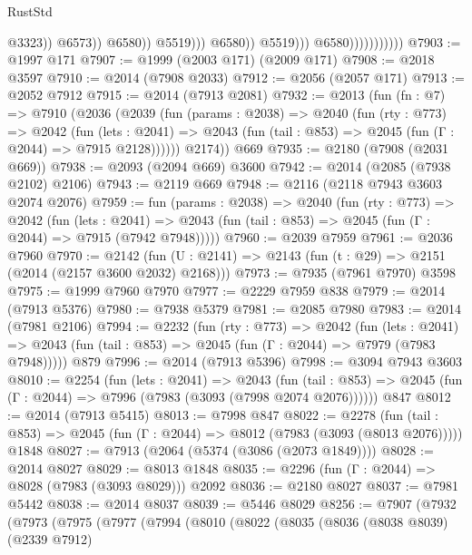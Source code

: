 \begin{lexlean}{RustStd}
\begin{coremodule}
                                                      @3323))
                                                  @6573))
                                              @6580))
                                          @5519)))
                                    @6580))
                                @5519)))
                          @6580)))))))))))
@7903 := @1997 @171
@7907 := @1999 (@2003 @171) (@2009 @171)
@7908 := @2018 @3597
@7910 := @2014 (@7908 @2033)
@7912 := @2056 (@2057 @171)
@7913 := @2052 @7912
@7915 := @2014 (@7913 @2081)
@7932 := @2013
    (fun (fn : @7) =>
    @7910
      (@2036
        (@2039
          (fun (params : @2038) =>
          @2040
            (fun (rty : @773) =>
            @2042
              (fun (lets : @2041) =>
              @2043 (fun (tail : @853) => @2045 (fun (Γ : @2044) => @7915 @2128))))))
        @2174))
    @669
@7935 := @2180 (@7908 (@2031 @669))
@7938 := @2093 (@2094 @669) @3600
@7942 := @2014 (@2085 (@7938 @2102) @2106)
@7943 := @2119 @669
@7948 := @2116 (@2118 @7943 @3603 @2074 @2076)
@7959 := fun (params : @2038) =>
  @2040
    (fun (rty : @773) =>
    @2042
      (fun (lets : @2041) =>
      @2043 (fun (tail : @853) => @2045 (fun (Γ : @2044) => @7915 (@7942 @7948)))))
@7960 := @2039 @7959
@7961 := @2036 @7960
@7970 := @2142 (fun (U : @2141) => @2143 (fun (t : @29) => @2151 (@2014 (@2157 @3600 @2032) @2168)))
@7973 := @7935 (@7961 @7970) @3598
@7975 := @1999 @7960 @7970
@7977 := @2229 @7959 @838
@7979 := @2014 (@7913 @5376)
@7980 := @7938 @5379
@7981 := @2085 @7980
@7983 := @2014 (@7981 @2106)
@7994 := @2232
    (fun (rty : @773) =>
    @2042
      (fun (lets : @2041) =>
      @2043 (fun (tail : @853) => @2045 (fun (Γ : @2044) => @7979 (@7983 @7948)))))
    @879
@7996 := @2014 (@7913 @5396)
@7998 := @3094 @7943 @3603
@8010 := @2254
    (fun (lets : @2041) =>
    @2043
      (fun (tail : @853) => @2045 (fun (Γ : @2044) => @7996 (@7983 (@3093 (@7998 @2074 @2076))))))
    @847
@8012 := @2014 (@7913 @5415)
@8013 := @7998 @847
@8022 := @2278
    (fun (tail : @853) => @2045 (fun (Γ : @2044) => @8012 (@7983 (@3093 (@8013 @2076)))))
    @1848
@8027 := @7913 (@2064 (@5374 (@3086 (@2073 @1849))))
@8028 := @2014 @8027
@8029 := @8013 @1848
@8035 := @2296 (fun (Γ : @2044) => @8028 (@7983 (@3093 @8029))) @2092
@8036 := @2180 @8027
@8037 := @7981 @5442
@8038 := @2014 @8037
@8039 := @5446 @8029
@8256 := @7907
    (@7932
      (@7973
        (@7975
          (@7977
            (@7994
              (@8010
                (@8022
                  (@8035
                    (@8036
                      (@8038 @8039)
                      (@2339 @7912)

\end{coremodule}
\end{lexlean}

